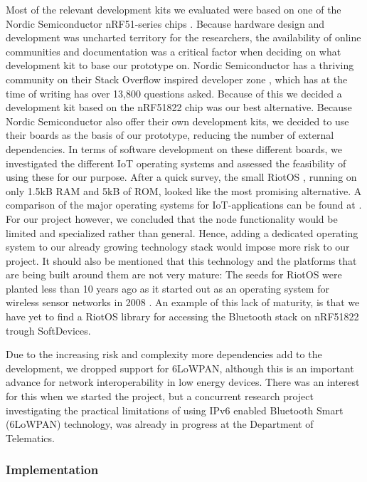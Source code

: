 Most of the relevant development kits we evaluated were based on one of the Nordic Semiconductor nRF51-series chips \cite{newRef:36, newRef:36:2}. Because hardware design and development was uncharted territory for the researchers, the availability of online communities and documentation was a critical factor when deciding on what development kit to base our prototype on. Nordic Semiconductor has a thriving community on their Stack Overflow inspired developer zone \cite{newRef:50}, which has at the time of writing has over 13,800 questions asked. Because of this we decided a development kit based on the nRF51822 chip was our best alternative. Because Nordic Semiconductor also offer their own development kits, we decided to use their boards as the basis of our prototype, reducing the number of external dependencies.
\noindent
In terms of software development on these different boards, we investigated the different IoT operating systems and assessed the feasibility of using these for our purpose. After a quick survey, the small RiotOS \cite{Anonymous:a1din1ZK}, running on only 1.5kB RAM and 5kB of ROM, looked like the most promising alternative. A comparison of the major operating systems for IoT-applications can be found at \cite{Anonymous:a1din1ZK}. For our project however, we concluded that the node functionality would be limited and specialized rather than general. Hence, adding a dedicated operating system to our already growing technology stack would impose more risk to our project. It should also be mentioned that this technology and the platforms that are being built around them are not very mature: The seeds for RiotOS were planted less than 10 years ago as it started out as an operating system for wireless sensor networks in 2008 \cite{newRef:52}. An example of this lack of maturity, is that we have yet to find a RiotOS library for accessing the Bluetooth stack on nRF51822 trough SoftDevices.

Due to the increasing risk and complexity more dependencies add to the development, we dropped support for 6LoWPAN, although this is an important advance for network interoperability in low energy devices. There was an interest for this when we started the project, but a concurrent research project investigating the practical limitations of using IPv6 enabled Bluetooth Smart (6LoWPAN) technology, was already in progress at the Department of Telematics.


\subsubsection{Implementation} %
\label{ssub:implementation}

